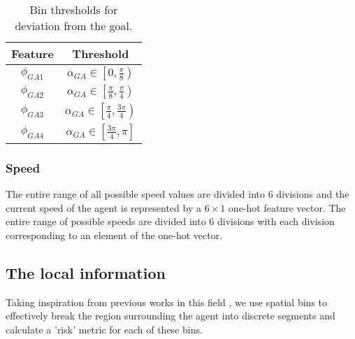 \begin{table}[htbp]
	\caption{Bin thresholds for deviation from the goal.}
	\label{deviation-from-goal-bins}
	\begin{center}
		\renewcommand{\arraystretch}{1.3}
		\begin{tabular}{|c|c|}
			\hline
			Feature & Threshold \\
			\hline
			$\phi_{GA1}$ & $\alpha_{GA} \in \left[ 0 , \frac{\pi}{8} \right)$ \\
			
			$\phi_{GA2}$ & $\alpha_{GA} \in \left[ \frac{\pi}{8} , \frac{\pi}{4} \right)$ \\
			
			$\phi_{GA3}$ & $\alpha_{GA} \in \left[ \frac{\pi}{4} , \frac{3\pi}{4} \right)$ \\
			
			$\phi_{GA4}$ & $\alpha_{GA} \in \left[ \frac{3\pi}{4} , \pi \right]$ \\
			\hline
		\end{tabular}
	\end{center}
\end{table}

\subsubsection*{Speed}
The entire range of all possible speed values are divided into 6 divisions and the current speed of the agent is represented by a $ 6 \times 1$ one-hot feature vector. The entire range of possible speeds are divided into 6 divisions with each division corresponding to an element of the one-hot vector.


\subsection*{The local information}
Taking inspiration from previous works in this field \cite{fahad-et-al} \cite{vasquez-et-al}, we use spatial bins to effectively break the region surrounding the agent into discrete segments and calculate a 'risk' metric for each of these bins.

